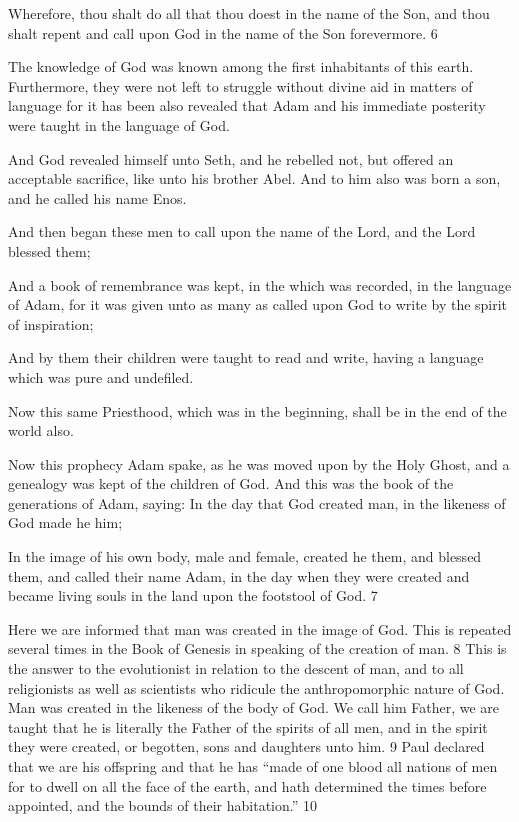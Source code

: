 Wherefore, thou shalt do all that thou doest in the name of the Son, and thou shalt repent and
call upon God in the name of the Son forevermore. 6

The knowledge of God was known among the first inhabitants of this earth. Furthermore,
they were not left to struggle without divine aid in matters of language for it has been also
revealed that Adam and his immediate posterity were taught in the language of God.

And God revealed himself unto Seth, and he rebelled not, but offered an acceptable sacrifice,
like unto his brother Abel. And to him also was born a son, and he called his name Enos.

And then began these men to call upon the name of the Lord, and the Lord blessed them;

And a book of remembrance was kept, in the which was recorded, in the language of Adam,
for it was given unto as many as called upon God to write by the spirit of inspiration;

And by them their children were taught to read and write, having a language which was pure
and undefiled.

Now this same Priesthood, which was in the beginning, shall be in the end of the world also.

Now this prophecy Adam spake, as he was moved upon by the Holy Ghost, and a genealogy
was kept of the children of God. And this was the book of the generations of Adam, saying:
In the day that God created man, in the likeness of God made he him;

In the image of his own body, male and female, created he them, and blessed them, and
called their name Adam, in the day when they were created and became living souls in the
land upon the footstool of God. 7

Here we are informed that man was created in the image of God. This is repeated several
times in the Book of Genesis in speaking of the creation of man. 8 This is the answer to the
evolutionist in relation to the descent of man, and to all religionists as well as scientists who
ridicule the anthropomorphic nature of God. Man was created in the likeness of the body of
God. We call him Father, we are taught that he is literally the Father of the spirits of all men,
and in the spirit they were created, or begotten, sons and daughters unto him. 9 Paul declared
that we are his offspring and that he has ``made of one blood all nations of men for to dwell
on all the face of the earth, and hath determined the times before appointed, and the bounds
of their habitation.'' 10

